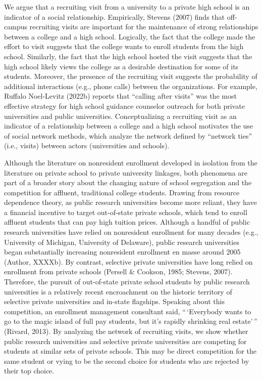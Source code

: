 \documentclass[
  12pt,
]{article}
\begin{document}
We argue that a recruiting visit from a university to a private high school is an indicator of a social relationship. Empirically, Stevens (2007) finds that off-campus recruiting visits are important for the maintenance of strong relationships between a college and a high school. Logically, the fact that the college made the effort to visit suggests that the college wants to enroll students from the high school. Similarly, the fact that the high school hosted the visit suggests that the high school likely views the college as a desirable destination for some of its students. Moreover, the presence of the recruiting visit suggests the probability of additional interactions (e.g., phone calls) between the organizations. For example, Ruffalo Noel-Levitz (2022b) reports that ``calling after visits'' was the most effective strategy for high school guidance counselor outreach for both private universities and public universities. Conceptualizing a recruiting visit as an indicator of a relationship between a college and a high school motivates the use of social network methods, which analyze the network defined by ``network ties'' (i.e., visits) between actors (universities and schools).

Although the literature on nonresident enrollment developed in isolation from the literature on private school to private university linkages, both phenomena are part of a broader story about the changing nature of school segregation and the competition for affluent, traditional college students. Drawing from resource dependence theory, as public research universities become more reliant, they have a financial incentive to target out-of-state private schools, which tend to enroll affluent students that can pay high tuition prices. Although a handful of public research universities have relied on nonresident enrollment for many decades (e.g., University of Michigan, University of Delaware), public research universities began substantially increasing nonresident enrollment en masse around 2005 (Author, XXXXb). By contrast, selective private universities have long relied on enrollment from private schools (Persell \& Cookson, 1985; Stevens, 2007). Therefore, the pursuit of out-of-state private school students by public research universities is a relatively recent encroachment on the historic territory of selective private universities and in-state flagships. Speaking about this competition, an enrollment management consultant said, ``\,`Everybody wants to go to the magic island of full pay students, but it's rapidly shrinking real estate'\,'' (Rivard, 2013). By analyzing the network of recruiting visits, we show whether public research universities and selective private universities are competing for students at similar sets of private schools. This may be direct competition for the same student or vying to be the second choice for students who are rejected by their top choice.
\end{document}
